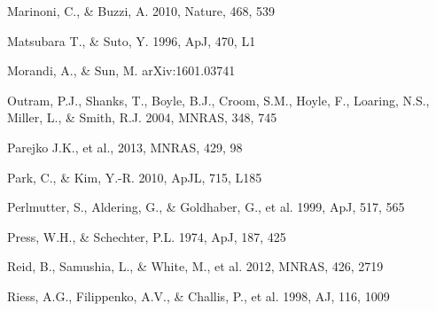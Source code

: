 \documentclass[iop]{emulateapj}
\begin{document}
\begin{thebibliography}{}
Marinoni, C., \& Buzzi, A. 2010, Nature, 468, 539  

Matsubara T., \& Suto, Y. 1996, ApJ, 470, L1  



Morandi, A., \& Sun, M. arXiv:1601.03741


Outram, P.J., Shanks, T., Boyle, B.J., Croom, S.M., Hoyle, F., Loaring, N.S., 
Miller, L., \& Smith, R.J. 2004, MNRAS, 348, 745  

Parejko J.K., et al., 2013, MNRAS, 429, 98



Park, C., \& Kim, Y.-R. 2010, ApJL, 715, L185  





Perlmutter, S., Aldering, G., \& Goldhaber, G., et al. 1999, ApJ, 517, 565  

Press, W.H., \& Schechter, P.L. 1974, ApJ, 187, 425

Reid, B., Samushia, L., \& White, M., et al. 2012, MNRAS, 426, 2719  


Riess, A.G., Filippenko, A.V., \& Challis, P., et al. 1998, AJ, 116, 1009  


\end{thebibliography}
\end{document}

